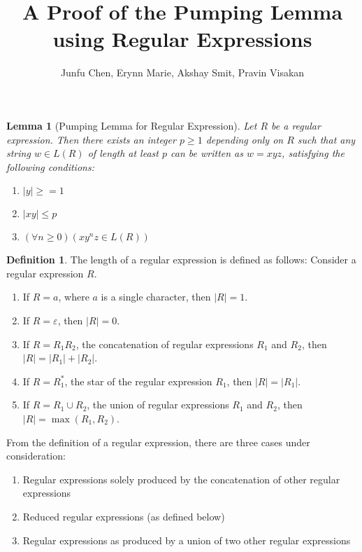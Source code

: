 \documentclass[11pt]{article}
\newtheorem*{lemma}{Lemma}
\theoremstyle{definition}
\newtheorem*{definition}{Definition}
\begin{document}
\author{Junfu Chen, Erynn Marie, Akshay Smit, Pravin Visakan}
\title{A Proof of the Pumping Lemma using Regular Expressions}
\maketitle

\medskip
\begin{lemma}[Pumping Lemma for Regular Expression] Let $R$ be a regular expression. Then there exists an integer $p\geq 1$ depending only on $R$ such that any string $w \in L(R)$ of length at least $p$ can be written as $w = xyz$, satisfying the following conditions:
\begin{enumerate}
    \item $|y| \geq = 1$
    \item $|xy|\leq p$
    \item $(\forall n\geq 0)(xy^nz\in L(R))$
\end{enumerate}
\end{lemma}
\smallskip
\begin{definition}
The length of a regular expression is defined as follows: Consider a regular expression $R$.
\begin{enumerate}
\item If $R = a$, where $a$ is a single character, then $|R| = 1$.
\item If $R = \varepsilon$, then $|R| = 0$. 
\item If $R = R_1R_2$, the concatenation of regular expressions $R_1$ and $R_2$, then $|R| = |R_1| + |R_2|$.
\item If $R = R_1^*$, the star of the regular expression $R_1$, then $|R| = |R_1|$. 
\item If $R = R_1 \cup R_2$, the union of regular expressions $R_1$ and $R_2$, then $|R| = \max(R_1, R_2)$.
\end{enumerate}
\end{definition}
From the definition of a regular expression, there are three cases under consideration:
\begin{enumerate}
\item Regular expressions solely produced by the concatenation of other regular expressions
\item Reduced regular expressions (as defined below)
\item Regular expressions as produced by a union of two other regular expressions
\end{enumerate}
\end{document}
